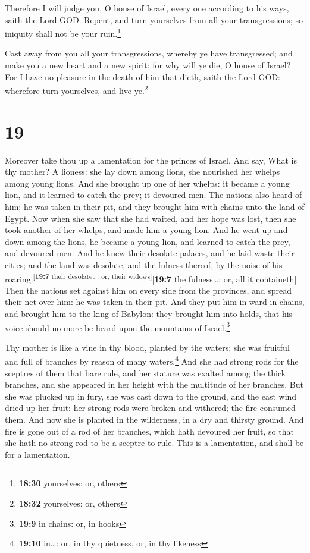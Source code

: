  Therefore I will judge you, O house of Israel, every one
according to his ways, saith the Lord GOD. Repent, and turn yourselves
from all your transgressions; so iniquity shall not be your
ruin.\footnote{\textbf{18:30} yourselves: or, others}

 Cast away from you all your transgressions, whereby ye
have transgressed; and make you a new heart and a new spirit: for why
will ye die, O house of Israel?  For I have no pleasure
in the death of him that dieth, saith the Lord GOD: wherefore turn
yourselves, and live ye.\footnote{\textbf{18:32} yourselves: or, others}

\hypertarget{section-18}{%
\section{19}\label{section-18}}

 Moreover take thou up a lamentation for the princes of
Israel,  And say, What is thy mother? A lioness: she lay
down among lions, she nourished her whelps among young lions.
 And she brought up one of her whelps: it became a young
lion, and it learned to catch the prey; it devoured men. 
The nations also heard of him; he was taken in their pit, and they
brought him with chains unto the land of Egypt.  Now when
she saw that she had waited, and her hope was lost, then she took
another of her whelps, and made him a young lion.  And he
went up and down among the lions, he became a young lion, and learned to
catch the prey, and devoured men.  And he knew their
desolate palaces, and he laid waste their cities; and the land was
desolate, and the fulness thereof, by the noise of his
roaring.\textsuperscript{{[}\textbf{19:7} their desolate\ldots: or,
their widows{]}}{[}\textbf{19:7} the fulness\ldots: or, all it
containeth{]}  Then the nations set against him on every
side from the provinces, and spread their net over him: he was taken in
their pit.  And they put him in ward in chains, and
brought him to the king of Babylon: they brought him into holds, that
his voice should no more be heard upon the mountains of
Israel.\footnote{\textbf{19:9} in chains: or, in hooks}

 Thy mother is like a vine in thy blood, planted by the
waters: she was fruitful and full of branches by reason of many
waters.\footnote{\textbf{19:10} in\ldots: or, in thy quietness, or, in
  thy likeness}  And she had strong rods for the sceptres
of them that bare rule, and her stature was exalted among the thick
branches, and she appeared in her height with the multitude of her
branches.  But she was plucked up in fury, she was cast
down to the ground, and the east wind dried up her fruit: her strong
rods were broken and withered; the fire consumed them. 
And now she is planted in the wilderness, in a dry and thirsty ground.
 And fire is gone out of a rod of her branches, which
hath devoured her fruit, so that she hath no strong rod to be a sceptre
to rule. This is a lamentation, and shall be for a lamentation.

